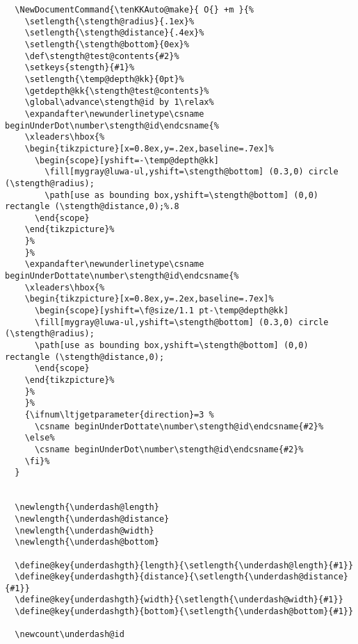 \documentclass[luatex,fontsize=8pt,paper=b5,twoside]{jlreq}%
\begin{document}
\begin{lstlisting}
  \NewDocumentCommand{\tenKKAuto@make}{ O{} +m }{%
    \setlength{\stength@radius}{.1ex}%
    \setlength{\stength@distance}{.4ex}%
    \setlength{\stength@bottom}{0ex}%
    \def\stength@test@contents{#2}%
    \setkeys{stength}{#1}%
    \setlength{\temp@depth@kk}{0pt}%
    \getdepth@kk{\stength@test@contents}%
    \global\advance\stength@id by 1\relax%
    \expandafter\newunderlinetype\csname beginUnderDot\number\stength@id\endcsname{%
    \xleaders\hbox{%
    \begin{tikzpicture}[x=0.8ex,y=.2ex,baseline=.7ex]%
      \begin{scope}[yshift=-\temp@depth@kk]
        \fill[mygray@luwa-ul,yshift=\stength@bottom] (0.3,0) circle (\stength@radius);
        \path[use as bounding box,yshift=\stength@bottom] (0,0) rectangle (\stength@distance,0);%.8
      \end{scope}
    \end{tikzpicture}%
    }%
    }%
    \expandafter\newunderlinetype\csname beginUnderDottate\number\stength@id\endcsname{%
    \xleaders\hbox{%
    \begin{tikzpicture}[x=0.8ex,y=.2ex,baseline=.7ex]%
      \begin{scope}[yshift=\f@size/1.1 pt-\temp@depth@kk]
      \fill[mygray@luwa-ul,yshift=\stength@bottom] (0.3,0) circle (\stength@radius);
      \path[use as bounding box,yshift=\stength@bottom] (0,0) rectangle (\stength@distance,0);
      \end{scope}
    \end{tikzpicture}%
    }%
    }%
    {\ifnum\ltjgetparameter{direction}=3 %
      \csname beginUnderDottate\number\stength@id\endcsname{#2}%
    \else%
      \csname beginUnderDot\number\stength@id\endcsname{#2}%
    \fi}%
  }


  \newlength{\underdash@length}
  \newlength{\underdash@distance}
  \newlength{\underdash@width}
  \newlength{\underdash@bottom}

  \define@key{underdashgth}{length}{\setlength{\underdash@length}{#1}}
  \define@key{underdashgth}{distance}{\setlength{\underdash@distance}{#1}}
  \define@key{underdashgth}{width}{\setlength{\underdash@width}{#1}}
  \define@key{underdashgth}{bottom}{\setlength{\underdash@bottom}{#1}}

  \newcount\underdash@id 


\end{lstlisting}
\end{document}
